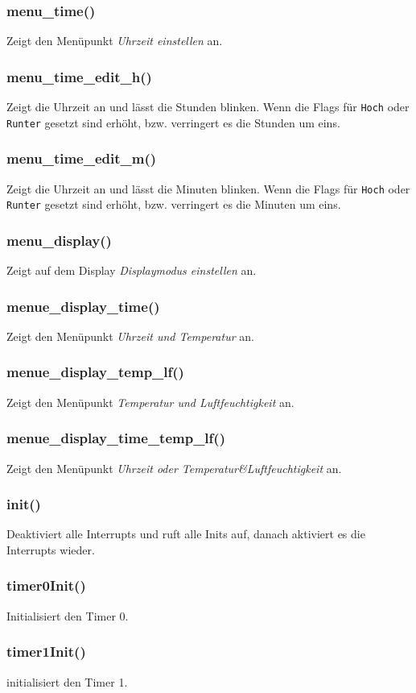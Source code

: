 \documentclass[10pt]{scrartcl}
\begin{document}
\subsubsection{menu\_time()}
Zeigt den Menüpunkt \textit{Uhrzeit einstellen} an.
\subsubsection{menu\_time\_edit\_h()}
Zeigt die Uhrzeit an und lässt die Stunden blinken. Wenn die Flags für \texttt{Hoch} oder \texttt{Runter} gesetzt sind erhöht, bzw. verringert es die Stunden um eins.
\subsubsection{menu\_time\_edit\_m()}
Zeigt die Uhrzeit an und lässt die Minuten blinken. Wenn die Flags für \texttt{Hoch} oder \texttt{Runter} gesetzt sind erhöht, bzw. verringert es die Minuten um eins.
\subsubsection{menu\_display()}
Zeigt auf dem Display \textit{Displaymodus einstellen} an.
\subsubsection{menue\_display\_time()}
Zeigt den Menüpunkt \textit{Uhrzeit und Temperatur} an.
\subsubsection{menue\_display\_temp\_lf()}
Zeigt den Menüpunkt \textit{Temperatur und Luftfeuchtigkeit} an.
\subsubsection{menue\_display\_time\_temp\_lf()}
Zeigt den Menüpunkt \textit{Uhrzeit oder Temperatur\&Luftfeuchtigkeit} an.
\subsubsection{init()}
Deaktiviert alle Interrupts und ruft alle Inits auf, danach aktiviert es die Interrupts wieder.
\subsubsection{timer0Init()}
Initialisiert den Timer 0.
\subsubsection{timer1Init()}
initialisiert den Timer 1.
\end{document}
